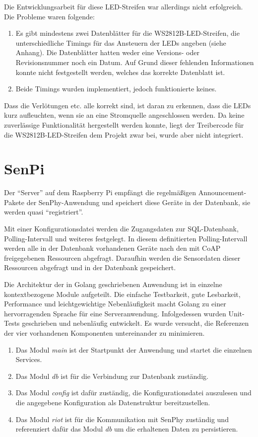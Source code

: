 \documentclass[a4paper]{article}
\begin{document}
Die Entwicklungsarbeit für diese LED-Streifen war allerdings nicht erfolgreich. Die Probleme waren folgende:
\begin{enumerate}
	\item Es gibt mindestens zwei Datenblätter für die WS2812B-LED-Streifen, die unterschiedliche Timings für das  Ansteuern der LEDs angeben (siehe Anhang). Die Datenblätter hatten weder eine Versions- oder Revisionsnummer noch ein Datum. Auf Grund dieser fehlenden Informationen konnte nicht festgestellt werden, welches das korrekte Datenblatt ist. 
    \item Beide Timings wurden implementiert, jedoch funktionierte keines.
\end{enumerate}
Dass die Verlötungen etc. alle korrekt sind, ist daran zu erkennen, dass die LEDs kurz aufleuchten, wenn sie an eine Stromquelle angeschlossen werden. Da keine zuverlässige Funktionalität hergestellt werden konnte, liegt der Treibercode für die WS2812B-LED-Streifen dem Projekt zwar bei, wurde aber nicht integriert. 

\section{SenPi}
Der \enquote{Server} auf dem Raspberry Pi empfängt die regelmäßigen Announcement-Pakete der SenPhy-Anwendung und speichert diese Geräte in der Datenbank, sie werden quasi \enquote{registriert}.

Mit einer Konfigurationsdatei werden die Zugangsdaten zur SQL-Datenbank, Polling-Intervall und weiteres festgelegt. In diesem definitierten Polling-Intervall werden alle in der Datenbank vorhandenen Geräte nach den mit CoAP freigegebenen Ressourcen abgefragt. Daraufhin werden die Sensordaten dieser Ressourcen abgefragt und in der Datenbank gespeichert.

Die Architektur der in Golang geschriebenen Anwendung ist in einzelne kontextbezogene Module aufgeteilt. Die einfache Testbarkeit, gute Lesbarkeit, Performance und leichtgewichtige Nebenläufigkeit macht Golang zu einer hervorragenden Sprache für eine Serveranwendung. Infolgedessen wurden Unit-Tests geschrieben und nebenläufig entwickelt. Es wurde versucht, die Referenzen der vier vorhandenen Komponenten untereinander zu minimieren.
\begin{enumerate}
\item Das Modul \emph{main} ist der Startpunkt der Anwendung und startet die einzelnen Services. 
\item Das Modul \emph{db} ist für die Verbindung zur Datenbank zuständig. 
\item Das Modul \emph{config} ist dafür zuständig, die Konfigurationsdatei auszulesen und die angegebene Konfiguration als Datenstruktur bereitzustellen.
\item Das Modul \emph{riot} ist für die Kommunikation mit SenPhy zuständig und referenziert dafür das Modul \emph{db} um die erhaltenen Daten zu persistieren.
\end{enumerate}
\end{document}
